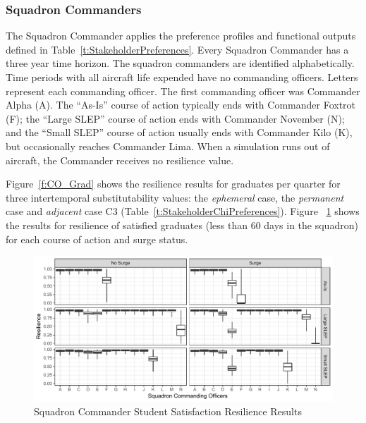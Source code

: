 \documentclass[preprint,12pt]{elsarticle}
\begin{document}
\subsubsection{Squadron Commanders}

The Squadron Commander applies the preference profiles and functional
outputs defined in Table~\ref{t:StakeholderPreferences}. Every
Squadron Commander has a three year time horizon. The squadron commanders are
identified alphabetically. Time periods with all aircraft life
expended have no commanding officers. Letters represent each
commanding officer. The first commanding officer was 
Commander Alpha (A). The ``As-Is'' course of action typically ends
with Commander Foxtrot (F); the ``Large SLEP'' course of action ends
with Commander November (N); and the ``Small SLEP'' course of action
usually ends with Commander Kilo (K), but occasionally reaches
Commander Lima. When a simulation runs out of aircraft, the Commander
receives no resilience value.

Figure~\ref{f:CO_Grad} shows the resilience
results for graduates per quarter for three intertemporal
substitutability values: the \emph{ephemeral} case, the
\emph{permanent} case and  \emph{adjacent} case C3
(Table~\ref{t:StakeholderChiPreferences}). Figure ~\ref{f:CO_Sat} shows the results for
resilience of satisfied graduates (less than 60 days in the squadron)
for each course of action and surge status.

\begin{figure}[h]
  \centering\includegraphics[width=5in]{CO_Sat}
  \caption{Squadron Commander Student Satisfaction Resilience Results
  \label{f:CO_Sat}}
\end{figure}
\end{document}
